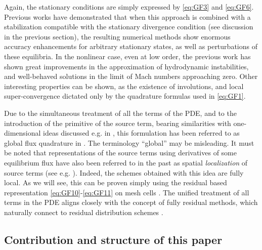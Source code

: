 \documentclass[a4paper,10pt]{article}
\begin{document}
Again, the stationary conditions are simply expressed by \eqref{eq:GF3} and \eqref{eq:GF6}.       
Previous works \cite{barsukow2025structure,barsukow2025genuinely,barsukow2025stationaritypreservingnodalfinite} have demonstrated that
when this approach is combined with a stabilization compatible with the stationary divergence condition (see discussion in the previous section),
the resulting numerical methods show enormous accuracy enhancements for arbitrary stationary states,
as well as perturbations of these equilibria. In the nonlinear case, even at low order, the 
previous work \cite{barsukow2025genuinely} has shown great improvements in the approximation of hydrodynamic instabilities,
and well-behaved solutions in the limit of Mach numbers approaching zero. Other interesting properties
can be shown, as the existence of involutions, and  local   super-convergence dictated only by the quadrature formulas used in \eqref{eq:GF1}.

  
Due to the simultaneous treatment  of all the terms of the PDE, and to the introduction of the primitive of the source term, bearing similarities
with one-dimensional ideas discussed e.g. in \cite{mantri2024fully,Cheng2019}, this formulation has been referred to  as global flux quadrature in   \cite{barsukow2025structure}. 
The terminology  ``global''  may be  misleading.  It must be noted that representations of the source terms using derivatives of some equilibrium flux 
have also been referred to in the past as spatial \emph{localization}  of source terms (see e.g. \cite{Gosse-toscani03}). 
Indeed, the schemes obtained with this idea are fully local. As we will see, this can be proven 
simply using the residual based representation \eqref{eq:GF10}-\eqref{eq:GF11} on mesh cells \cite{barsukow2025genuinely}. 
The unified treatment of all terms in the PDE aligns closely with the concept of fully residual methods, which naturally connect to residual distribution schemes \cite{Abgrall2022,amr2025}.



 
\subsection{Contribution and structure of this paper}
\end{document}
